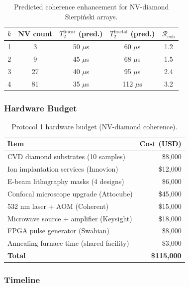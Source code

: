 \begin{table}[h]
\caption{Predicted coherence enhancement for NV-diamond Sierpi\'{n}ski arrays.}
\label{tab:nv_predictions}
\begin{ruledtabular}
\begin{tabular}{ccccc}
$k$ & NV count & $T_2^{\mathrm{linear}}$ (pred.) & $T_2^{\mathrm{fractal}}$ (pred.) & $\mathcal{R}_{\mathrm{coh}}$ \\
\hline
1 & 3 & 50 $\mu$s & 60 $\mu$s & 1.2 \\
2 & 9 & 45 $\mu$s & 68 $\mu$s & 1.5 \\
3 & 27 & 40 $\mu$s & 95 $\mu$s & 2.4 \\
4 & 81 & 35 $\mu$s & 112 $\mu$s & 3.2 \\
\end{tabular}
\end{ruledtabular}
\end{table}

\subsubsection{Hardware Budget}

\begin{table}[h]
\caption{Protocol 1 hardware budget (NV-diamond coherence).}
\label{tab:budget_p1}
\begin{ruledtabular}
\begin{tabular}{lr}
\textbf{Item} & \textbf{Cost (USD)} \\
\hline
CVD diamond substrates (10 samples) & \$8,000 \\
Ion implantation services (Innovion) & \$12,000 \\
E-beam lithography masks (4 designs) & \$6,000 \\
Confocal microscope upgrade (Attocube) & \$45,000 \\
532 nm laser + AOM (Coherent) & \$15,000 \\
Microwave source + amplifier (Keysight) & \$18,000 \\
FPGA pulse generator (Swabian) & \$8,000 \\
Annealing furnace time (shared facility) & \$3,000 \\
\hline
\textbf{Total} & \textbf{\$115,000} \\
\end{tabular}
\end{ruledtabular}
\end{table}

\subsubsection{Timeline}


